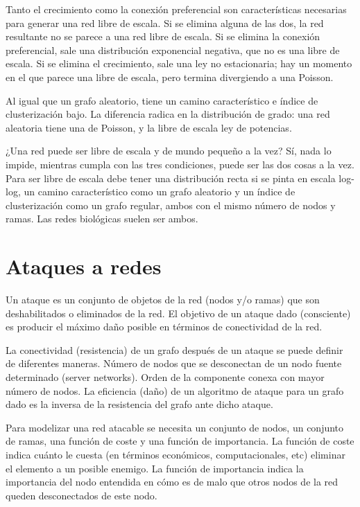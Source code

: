 Tanto el crecimiento como la conexión preferencial son características necesarias para generar una red libre de escala. Si se elimina alguna de las dos, la red resultante no se parece a una red libre de escala. Si se elimina la conexión preferencial, sale una distribución exponencial negativa, que no es una libre de escala. Si se elimina el crecimiento, sale una ley no estacionaria; hay un momento en el que parece una libre de escala, pero termina divergiendo a una Poisson.

Al igual que un grafo aleatorio, tiene un camino característico e índice de clusterización bajo. La diferencia radica en la distribución de grado: una red aleatoria tiene una de Poisson, y la libre de escala ley de potencias.

¿Una red puede ser libre de escala y de mundo pequeño a la vez? Sí, nada lo impide, mientras cumpla con las tres condiciones, puede ser las dos cosas a la vez. Para ser libre de escala debe tener una distribución recta si se pinta en escala log-log, un camino característico como un grafo aleatorio y un índice de clusterización como un grafo regular, ambos con el mismo número de nodos y ramas. Las redes biológicas suelen ser ambos.

\section{Ataques a redes}
Un ataque es un conjunto de objetos de la red (nodos y/o ramas) que son deshabilitados o eliminados de la red. El objetivo de un ataque dado (consciente) es producir el máximo daño posible en términos de conectividad de la red.

La conectividad (resistencia) de un grafo después de un ataque se puede definir de diferentes
maneras. Número de nodos que se desconectan de un nodo fuente determinado (server networks). Orden de la componente conexa con mayor número de nodos. La eficiencia (daño) de un algoritmo de ataque para un grafo dado es la inversa de la resistencia del grafo ante dicho ataque.

Para modelizar una red atacable se necesita un conjunto de nodos, un conjunto de ramas, una función de coste y una función de importancia. La función de coste indica cuánto le cuesta (en términos económicos, computacionales, etc) eliminar el elemento a un posible enemigo. 
La función de importancia indica la importancia del nodo entendida en cómo es de malo que otros nodos de la red queden desconectados de este nodo.

